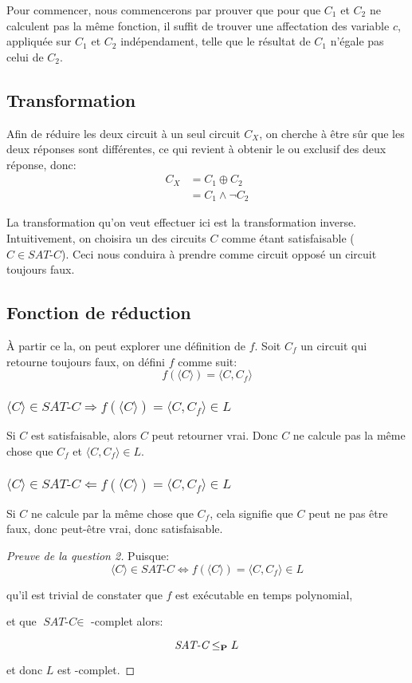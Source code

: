\documentclass{article}
\newcommand\NP{{\normalfont{\textbf{NP}}}}
\newcommand\PP{{\normalfont{\textbf{P}}}}
\newcommand\SC{\textit{SAT-C}}
\newcommand\bk[1]{\langle #1 \rangle}
\begin{document}
Pour commencer, nous commencerons par prouver que pour que $C_1$ et $C_2$ ne calculent pas la même fonction, il suffit de trouver une affectation des variable $c$, appliquée sur $C_1$ et $C_2$ indépendament, telle que le résultat de $C_1$ n'égale pas celui de $C_2$.

\subsection{Transformation}
Afin de réduire les deux circuit à un seul circuit $C_X$, on cherche à être sûr que les deux réponses sont différentes, ce qui revient à obtenir le ou exclusif des deux réponse, donc:
\begin{align*}
  C_X &= C_1 \oplus C_2\\
  &= C_1 \wedge \neg C_2
\end{align*}

La transformation qu'on veut effectuer ici est la transformation inverse. Intuitivement, on choisira un des circuits $C$ comme étant satisfaisable ($C \in \SC$). Ceci nous conduira à prendre comme circuit opposé un circuit toujours faux.

\subsection{Fonction de réduction}
À partir ce la, on peut explorer une définition de $f$. Soit $C_f$ un circuit qui retourne toujours faux, on défini $f$ comme suit:
$$f(\bk{C})=\bk{C, C_f}$$

\subsubsection{\normalfont $\bk{C} \in \SC \Rightarrow f(\bk{C})=\bk{C,C_f} \in L$}
Si $C$ est satisfaisable, alors $C$ peut retourner vrai. Donc $C$ ne calcule pas la même chose que $C_f$ et $\bk{C, C_f} \in L$.

\subsubsection{\normalfont $\bk{C} \in \SC \Leftarrow f(\bk{C})=\bk{C,C_f} \in L$}
Si $C$ ne calcule par la même chose que $C_f$, cela signifie que $C$ peut ne pas être faux, donc peut-être vrai, donc satisfaisable.

\begin{proof}[Preuve de la question 2]
  Puisque:
  $$\bk{C} \in \SC \Leftrightarrow f(\bk{C})=\bk{C,C_f} \in L$$

  qu'il est trivial de constater que $f$ est exécutable en temps polynomial,

  et que $\SC \in$ \NP-complet alors:
  
  $$\SC \leq_\PP L$$
  
  et donc $L$ est \NP-complet.
\end{proof}
\end{document}
